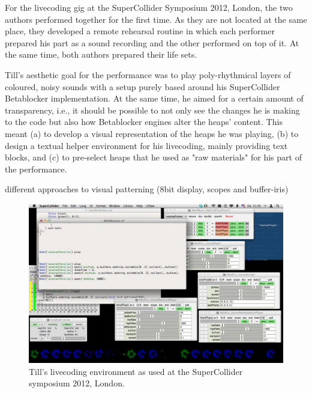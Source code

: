 \documentclass[letterpaper, 12pt]{article}
\begin{document}
For the livecoding gig at the SuperCollider Symposium 2012, London, the two authors performed together for the first time. 
As they are not located at the same place, they developed a remote rehearsal routine in which each performer prepared his part as a sound recording and the other performed on top of it.
At the same time, both authors prepared their life sets.

Till's aesthetic goal for the performance was to play poly-rhythmical layers of coloured, noisy sounds with a setup purely based around his SuperCollider Betablocker implementation. 
At the same time, he aimed for a certain amount of transparency, i.e., it should be possible to not only see the changes he is making to the code but also how  Betablocker engines alter the heaps' content.
This meant 
(a) to develop a visual representation of the heaps he was playing, 
(b) to design a textual helper environment for his livecoding, mainly providing text blocks, and
(c) to pre-select heaps that he used as "raw materials" for his part of the  performance.

different approaches to visual patterning (8bit display, scopes and buffer-iris)

\begin{figure}
	\centering
		\includegraphics[width=13cm]{2012-SuperColliderSymposiumLiveCodingEnvironment-till}
	\caption{Till's livecoding environment as used at the SuperCollider symposium 2012, London.}
	\label{fig:fig_2012-SuperColliderSymposiumLiveCodingEnvironment-till}
\end{figure}
\end{document}
